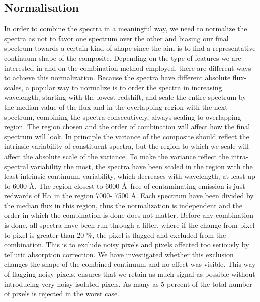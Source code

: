\documentclass{aa}    %
\newcommand{\sectlabel}[1]{\label{sect:#1}}
\begin{document}
\subsection{Normalisation}  \sectlabel{norm}

In order to combine the spectra in a meaningful way, we need to normalize the spectra as not to favor one spectrum over the other and biasing our final spectrum towards a certain kind of shape since the aim is to find a representative continuum shape of the composite. Depending on the type of features we are interested in and on the combination method employed, there are different ways to achieve this normalization. Because the spectra have different absolute flux-scales, a popular way to normalize is to order the spectra in increasing wavelength, starting with the lowest redshift, and scale the entire spectrum by the median value of the flux and in the overlapping region with the next spectrum, combining the spectra consecutively, always scaling to overlapping region. The region chosen and the order of combination will affect how the final spectrum will look\citep{Francis1991,Brotherton2000,VandenBerk2001,Glikman2006}.
In principle the variance of the composite should reflect the intrinsic variability of constituent spectra, but the region to which we scale will affect the absolute scale of the variance. To make the variance reflect the intra-spectral variability the most, the spectra have been scaled in the region with the least intrinsic continuum variability, which decreases with wavelength, at least up to 6000 \AA \citep{VandenBerk2004}. The region closest to 6000 \AA~free of contaminating emission is just redwards of H$\alpha$ in the region 7000- 7500 \AA. Each spectrum have been divided by the median flux in this region, thus the normalization is independent and the order in which the combination is done does not matter. 
Before any combination is done, all spectra have been run through a filter, where if the change from pixel to pixel is greater than 20 \%, the pixel is flagged and excluded from the combination. This is to exclude noisy pixels and pixels affected too seriously by telluric absorption correction. We have investigated whether this exclusion changes the shape of the combined continuum and no effect was visible. This way of flagging noisy pixels, ensures that we retain as much signal as possible without introducing very noisy isolated pixels. As many as 5 percent of the total number of pixels is rejected in the worst case. 
\end{document}
